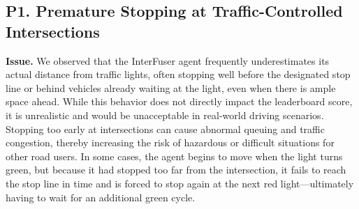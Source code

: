 \begin{table}[t]
    \small
    \centering
    \caption{Summary of Common Failure Modes Across Models}
    \label{tab:failure_modes}
\end{table}

\subsection{P1. Premature Stopping at Traffic-Controlled Intersections}\label{P1}
\noindent\textbf{Issue.} We observed that the InterFuser agent frequently underestimates its actual distance from traffic lights, often stopping well before the designated stop line or behind vehicles already waiting at the light, even when there is ample space ahead. While this behavior does not directly impact the leaderboard score, it is unrealistic and would be unacceptable in real-world driving scenarios. Stopping too early at intersections can cause abnormal queuing and traffic congestion, thereby increasing the risk of hazardous or difficult situations for other road users.
In some cases, the agent begins to move when the light turns green, but because it had stopped too far from the intersection, it fails to reach the stop line in time and is forced to stop again at the next red light—ultimately having to wait for an additional green cycle.

